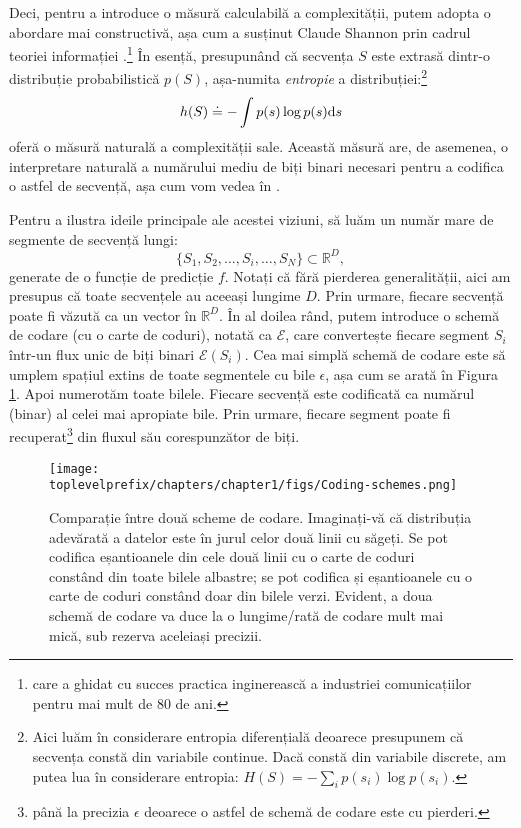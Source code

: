 \documentclass[../../book-main_ro.tex]{subfiles}
\begin{document}
Deci, pentru a introduce o măsură calculabilă a complexității, putem adopta o abordare mai constructivă, așa cum a susținut Claude Shannon prin cadrul teoriei informației \cite{Shannon-1948,Cover-Thomas}.\footnote{care a ghidat cu succes practica inginerească a industriei comunicațiilor pentru mai mult de 80 de ani.} În esență, presupunând că secvența $S$ este extrasă dintr-o distribuție probabilistică $p(S)$, așa-numita {\em entropie} a distribuției:\footnote{Aici luăm în considerare entropia diferențială deoarece presupunem că secvența constă din variabile continue. Dacă constă din variabile discrete, am putea lua în considerare entropia: $H(S) = - \sum_{i}p(s_i) \log p(s_i).$ }
\begin{equation}
    h(S) \doteq -\int p(s) \log p(s) \mathrm{d}s
    \label{eqn:entropy-definition}
\end{equation}
oferă o măsură naturală a complexității sale. Această măsură are, de asemenea, o interpretare naturală a numărului mediu de biți binari necesari pentru a codifica o astfel de secvență, așa cum vom vedea în .

Pentru a ilustra ideile principale ale acestei viziuni, să luăm un număr mare de segmente de secvență lungi:
\begin{equation}
    \{S_1, S_2, \ldots, S_i, \ldots, S_N\} \subset \mathbb{R}^D,
\end{equation}
generate de o funcție de predicție $f$. Notați că fără pierderea generalității, aici am presupus că toate secvențele au aceeași lungime $D$. Prin urmare, fiecare secvență poate fi văzută ca un vector în $\mathbb{R}^D$. În al doilea rând, putem introduce o schemă de codare (cu o carte de coduri), notată ca $\mathcal E$, care convertește fiecare segment $S_i$ într-un flux unic de biți binari $\mathcal{E}(S_i)$. Cea mai simplă schemă de codare este să umplem spațiul extins de toate segmentele cu bile $\epsilon$, așa cum se arată în Figura \ref{fig:coding-schemes}. Apoi numerotăm toate bilele. Fiecare secvență este codificată ca numărul (binar) al celei mai apropiate bile. Prin urmare, fiecare segment poate fi recuperat\footnote{până la precizia $\epsilon$ deoarece o astfel de schemă de codare este cu pierderi.} din fluxul său corespunzător de biți.
\begin{figure}
    \centering
    \texttt{[image: \\toplevelprefix/chapters/chapter1/figs/Coding-schemes.png]}
    \caption{Comparație între două scheme de codare. Imaginați-vă că distribuția adevărată a datelor este în jurul celor două linii cu săgeți. Se pot codifica eșantioanele din cele două linii cu o carte de coduri constând din toate bilele albastre; se pot codifica și eșantioanele cu o carte de coduri constând doar din bilele verzi. Evident, a doua schemă de codare va duce la o lungime/rată de codare mult mai mică, sub rezerva aceleiași precizii.}
    \label{fig:coding-schemes}
\end{figure}
\end{document}
